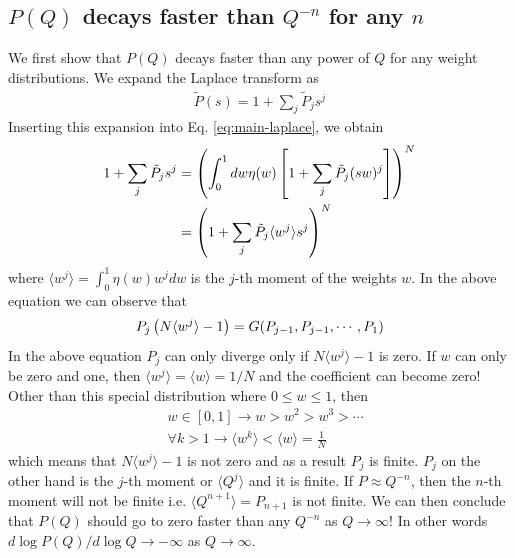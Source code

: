 \subsection*{$P(Q)$ decays faster than $Q^{-n}$ for any $n$}
We first show that $P(Q)$ decays faster than any power of $Q$ for any
weight distributions. We expand the Laplace transform as
%
\begin{align}
  \tilde P(s) = 1 + \sum_j \tilde P_{j} s^{j}
\end{align}
%
Inserting this expansion into Eq. \eqref{eq:main-laplace}, we obtain
%
\begin{align}
  1 + \sum_j \tilde P_{j} s^{j}  & = \left(  \int_0^1 d w \eta(w) \left[ 1 + \sum_j \tilde P_{j} (sw)^{j}\right]    \right)^{N} \\
 & = \left(  1 + \sum_j \tilde P_j \langle w^{j}\rangle  s^{j}   \right)^{N}
\end{align}
%
where $\langle w^j \rangle = \int_0^1 \eta(w) w^j dw$ is the $j$-th
moment of the weights $w$. In the above equation we can observe that
%
\begin{align}
  P_j \left( N \langle w^j\rangle -1 \right) = G(P_{j-1}, P_{j-1}, \cdots, P_1)
\end{align}
%
In the above equation $P_j$ can only diverge only if $N\langle w^j
\rangle -1$ is zero. If $w$ can only be zero and one, then $\langle
w^j\rangle =\langle w \rangle = 1/N$ and the coefficient can become
zero! Other than this special distribution where $0 \leq w \leq 1$,
then
%
\begin{align}
  & w\in [0,1] \rightarrow w>w^2>w^3> \cdots \\
  & \forall k>1 \rightarrow \langle w^k \rangle < \langle w \rangle = \frac{1}{N} 
\end{align}
%
which means that $N\langle w^j \rangle -1$ is not zero and as a result
$P_j$ is finite. $P_j$ on the other hand is the $j$-th moment or
$\langle Q^j\rangle$ and it is finite. If $P\approx Q^{-n}$, then the
$n$-th moment will not be finite i.e. $\langle Q^{n+1}\rangle =
P_{n+1}$ is not finite. We can then conclude that $P(Q)$ should go to
zero faster than any $Q^{-n}$ as $Q\to \infty$! In other words $d \log
P(Q) / d \log Q \to -\infty$ as $Q\to \infty$.  

